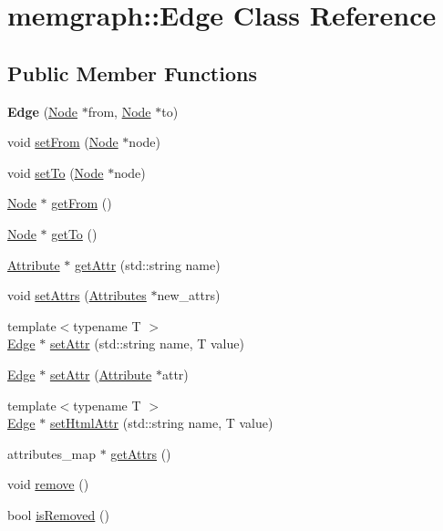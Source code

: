 \hypertarget{classmemgraph_1_1_edge}{}\section{memgraph\+:\+:Edge Class Reference}
\label{classmemgraph_1_1_edge}
\subsection*{Public Member Functions}
\begin{DoxyCompactItemize}
\item 
{\bfseries Edge} (\hyperlink{classmemgraph_1_1_node}{Node} $\ast$from, \hyperlink{classmemgraph_1_1_node}{Node} $\ast$to)\hypertarget{classmemgraph_1_1_edge_acc40d41d76b5a46a1892d4369d01ebad}{}\label{classmemgraph_1_1_edge_acc40d41d76b5a46a1892d4369d01ebad}

\item 
void \hyperlink{classmemgraph_1_1_edge_ad5b1d80a8fc2048caff5825302a3595d}{set\+From} (\hyperlink{classmemgraph_1_1_node}{Node} $\ast$node)
\item 
void \hyperlink{classmemgraph_1_1_edge_a65bc640add809d698fc52cd15210a915}{set\+To} (\hyperlink{classmemgraph_1_1_node}{Node} $\ast$node)
\item 
\hyperlink{classmemgraph_1_1_node}{Node} $\ast$ \hyperlink{classmemgraph_1_1_edge_a1846f19a1bbc8b965eb2a459de1c34a2}{get\+From} ()
\item 
\hyperlink{classmemgraph_1_1_node}{Node} $\ast$ \hyperlink{classmemgraph_1_1_edge_a90429a59ce28725688812207d6481bc9}{get\+To} ()
\item 
\hyperlink{classmemgraph_1_1_attribute}{Attribute} $\ast$ \hyperlink{classmemgraph_1_1_edge_aa277da934ab7b0473616e02079e438ca}{get\+Attr} (std\+::string name)
\item 
void \hyperlink{classmemgraph_1_1_edge_a32cbbdaa503fcd17a070a4efc5e489ce}{set\+Attrs} (\hyperlink{classmemgraph_1_1_attributes}{Attributes} $\ast$new\+\_\+attrs)
\item 
{\footnotesize template$<$typename T $>$ }\\\hyperlink{classmemgraph_1_1_edge}{Edge} $\ast$ \hyperlink{classmemgraph_1_1_edge_a4326b5091c2aeaea51182844e6e35281}{set\+Attr} (std\+::string name, T value)
\item 
\hyperlink{classmemgraph_1_1_edge}{Edge} $\ast$ \hyperlink{classmemgraph_1_1_edge_a284135fc603ede05d24639352508687e}{set\+Attr} (\hyperlink{classmemgraph_1_1_attribute}{Attribute} $\ast$attr)
\item 
{\footnotesize template$<$typename T $>$ }\\\hyperlink{classmemgraph_1_1_edge}{Edge} $\ast$ \hyperlink{classmemgraph_1_1_edge_a8de89badd13aa6a5430319e4dc4c1ca9}{set\+Html\+Attr} (std\+::string name, T value)
\item 
attributes\+\_\+map $\ast$ \hyperlink{classmemgraph_1_1_edge_a9ee5408a7a73fe763716748eb120dcdf}{get\+Attrs} ()
\item 
void \hyperlink{classmemgraph_1_1_edge_ae8624e38151bfa3f444aec503e16282e}{remove} ()
\item 
bool \hyperlink{classmemgraph_1_1_edge_a701d43f4b964c683964923bffd07deca}{is\+Removed} ()
\end{DoxyCompactItemize}
